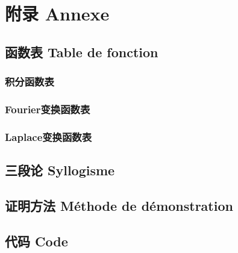 \documentclass[12pt, a4paper, oneside]{ctexbook}
\begin{document}
  \part{附录 Annexe}
  \appendix
  \chapter{函数表 Table de fonction}
  \section{积分函数表 }
  \section{Fourier变换函数表 }
  \section{Laplace变换函数表 }
  \chapter{三段论 Syllogisme}
  \chapter{证明方法 Méthode de démonstration}
  \chapter{代码 Code}

  \printindex
\end{document}

